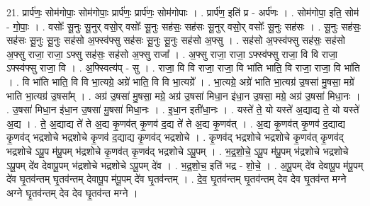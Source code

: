 \documentclass[17pt]{extarticle}
\begin{document}
21. प्रार्प॑णः॒ सोम॑गोपाः॒ सोम॑गोपाः॒ प्रार्प॑णः॒ प्रार्प॑णः॒ सोम॑गोपाः । . प्रार्प॑ण॒ इति॑ प्र - अर्प॑णः । . सोम॑गोपा॒ इति॒ सोम॑ - गो॒पाः॒ । . वसोः᳚ सू॒नुः सू॒नुर् वसो॒र् वसोः᳚ सू॒नुः सह॑सः॒ सह॑सः सू॒नुर् वसो॒र् वसोः᳚ सू॒नुः सह॑सः । . सू॒नुः सह॑सः॒ सह॑सः सू॒नुः सू॒नुः सह॑सो अ॒फ्स्व॑फ्सु सह॑सः सू॒नुः सू॒नुः सह॑सो अ॒फ्सु । . सह॑सो अ॒फ्स्व॑फ्सु सह॑सः॒ सह॑सो अ॒फ्सु राजा॒ राजा॒ ऽफ्सु सह॑सः॒ सह॑सो अ॒फ्सु राजा᳚ । . अ॒फ्सु राजा॒ राजा॒ ऽफ्स्व॑फ्सु राजा॒ वि वि राजा॒ ऽफ्स्व॑फ्सु राजा॒ वि । . अ॒फ्स्वित्य॑प् - सु । . राजा॒ वि वि राजा॒ राजा॒ वि भा॑ति भाति॒ वि राजा॒ राजा॒ वि भा॑ति । . वि भा॑ति भाति॒ वि वि भा॒त्यग्रे॒ अग्रे॑ भाति॒ वि वि भा॒त्यग्रे᳚ । . भा॒त्यग्रे॒ अग्रे॑ भाति भा॒त्यग्र॑ उ॒षसा॑ मु॒षसा॒ मग्रे॑ भाति भा॒त्यग्र॑ उ॒षसा᳚म् । . अग्र॑ उ॒षसा॑ मु॒षसा॒ मग्रे॒ अग्र॑ उ॒षसा॑ मिधा॒न इ॑धा॒न उ॒षसा॒ मग्रे॒ अग्र॑ उ॒षसा॑ मिधा॒नः । . उ॒षसा॑ मिधा॒न इ॑धा॒न उ॒षसा॑ मु॒षसा॑ मिधा॒नः । . इ॒धा॒न इती॑धा॒नः । . यस्ते॑ ते॒ यो यस्ते॑ अ॒द्याद्य ते॒ यो यस्ते॑ अ॒द्य । . ते॒ अ॒द्याद्य ते॑ ते अ॒द्य कृ॒णव॑त् कृ॒णव॑ द॒द्य ते॑ ते अ॒द्य कृ॒णव॑त् । . अ॒द्य कृ॒णव॑त् कृ॒णव॑ द॒द्याद्य कृ॒णव॑द् भद्रशोचे भद्रशोचे कृ॒णव॑ द॒द्याद्य कृ॒णव॑द् भद्रशोचे । . कृ॒णव॑द् भद्रशोचे भद्रशोचे कृ॒णव॑त् कृ॒णव॑द् भद्रशोचे ऽपू॒प म॑पू॒पम् भ॑द्रशोचे कृ॒णव॑त् कृ॒णव॑द् भद्रशोचे ऽपू॒पम् । . भ॒द्र॒शो॒चे॒ ऽपू॒प म॑पू॒पम् भ॑द्रशोचे भद्रशोचे ऽपू॒पम् दे॑व देवापू॒पम् भ॑द्रशोचे भद्रशोचे ऽपू॒पम् दे॑व । . भ॒द्र॒शो॒च॒ इति॑ भद्र - शो॒चे॒ । . अ॒पू॒पम् दे॑व देवापू॒प म॑पू॒पम् दे॑व घृ॒तव॑न्तम् घृ॒तव॑न्तम् देवापू॒प म॑पू॒पम् दे॑व घृ॒तव॑न्तम् । . दे॒व॒ घृ॒तव॑न्तम् घृ॒तव॑न्तम् देव देव घृ॒तव॑न्त मग्ने अग्ने घृ॒तव॑न्तम् देव देव घृ॒तव॑न्त मग्ने । \newline
\end{document}
